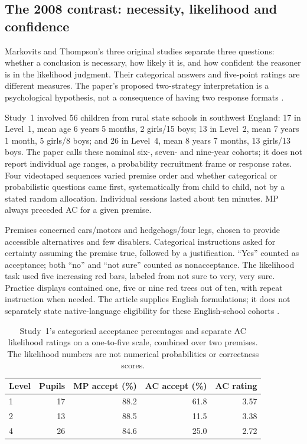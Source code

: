 \subsection{The 2008 contrast: necessity, likelihood and confidence}
\label{sec:p19-r151-2008-record}

Markovits and Thompson's three original studies separate three questions:
whether a conclusion is necessary, how likely it is, and how confident the
reasoner is in the likelihood judgment. Their categorical answers and
five-point ratings are different measures. The paper's proposed two-strategy
interpretation is a psychological hypothesis, not a consequence of having
two response formats
\cite[pp.~1066--1069]{MarkovitsThompson2008Development}.

Study~1 involved 56 children from rural state schools in southwest England:
17 in Level~1, mean age 6 years 5 months, 2 girls/15 boys;
13 in Level~2, mean 7 years 1 month, 5 girls/8 boys; and 26 in
Level~4, mean 8 years 7 months, 13 girls/13 boys. The paper calls these
nominal six-, seven- and nine-year cohorts; it does not report individual
age ranges, a probability recruitment frame or response rates. Four
videotaped sequences varied premise order and whether categorical or
probabilistic questions came first, systematically from child to child,
not by a stated random allocation. Individual sessions lasted about ten
minutes. MP always preceded AC for a given premise.

Premises concerned cars/motors and hedgehogs/four legs, chosen to provide
accessible alternatives and few disablers. Categorical instructions asked
for certainty assuming the premise true, followed by a justification.
``Yes'' counted as acceptance; both ``no'' and ``not sure'' counted as
nonacceptance. The likelihood task used five increasing red bars, labeled
from not sure to very, very sure. Practice displays contained one, five
or nine red trees out of ten, with repeat instruction when needed.
The article supplies English formulations; it does not separately state
native-language eligibility for these English-school cohorts
\cite[pp.~1069--1071]{MarkovitsThompson2008Development}.

\begin{table}[htbp]
\centering\small
\begin{tabular}{lrrrr}
\hline
Level & Pupils & MP accept (\%) & AC accept (\%) & AC rating\\
\hline
1 & 17 & 88.2 & 61.8 & 3.57\\
2 & 13 & 88.5 & 11.5 & 3.38\\
4 & 26 & 84.6 & 25.0 & 2.72\\
\hline
\end{tabular}
\caption{Study~1's categorical acceptance percentages and separate AC
likelihood ratings on a one-to-five scale, combined over two premises.
The likelihood numbers are not numerical probabilities or correctness scores.}
\label{tab:p19-r151-2008-study1}
\end{table}

